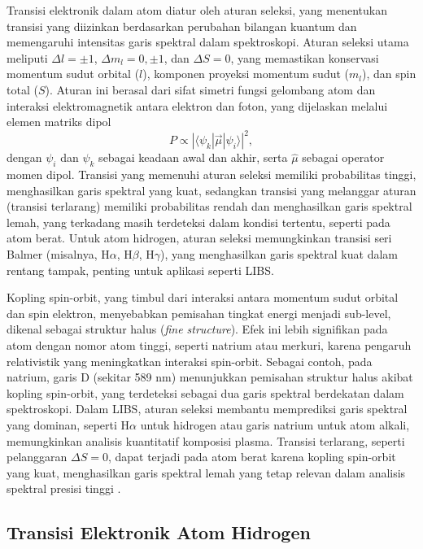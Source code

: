 Transisi elektronik dalam atom diatur oleh aturan seleksi, yang menentukan transisi yang diizinkan berdasarkan perubahan bilangan kuantum dan memengaruhi intensitas garis spektral dalam spektroskopi. Aturan seleksi utama meliputi \( \Delta l = \pm 1 \), \( \Delta m_l = 0, \pm 1 \), dan \( \Delta S = 0 \), yang memastikan konservasi momentum sudut orbital (\( l \)), komponen proyeksi momentum sudut (\( m_l \)), dan spin total (\( S \)). Aturan ini berasal dari sifat simetri fungsi gelombang atom dan interaksi elektromagnetik antara elektron dan foton, yang dijelaskan melalui elemen matriks dipol
\begin{equation}
P \propto |\langle \psi_k | \vec{\mu} | \psi_i \rangle|^2, \label{eq:bab2_eq2}
\end{equation}
dengan \( \psi_i \) dan \( \psi_k \) sebagai keadaan awal dan akhir, serta \( \hat{\mu} \) sebagai operator momen dipol. Transisi yang memenuhi aturan seleksi memiliki probabilitas tinggi, menghasilkan garis spektral yang kuat, sedangkan transisi yang melanggar aturan (transisi terlarang) memiliki probabilitas rendah dan menghasilkan garis spektral lemah, yang terkadang masih terdeteksi dalam kondisi tertentu, seperti pada atom berat. Untuk atom hidrogen, aturan seleksi memungkinkan transisi seri Balmer (misalnya, H\(\alpha\), H\(\beta\), H\(\gamma\)), yang menghasilkan garis spektral kuat dalam rentang tampak, penting untuk aplikasi seperti LIBS. 
\par Kopling spin-orbit, yang timbul dari interaksi antara momentum sudut orbital dan spin elektron, menyebabkan pemisahan tingkat energi menjadi sub-level, dikenal sebagai struktur halus (\textit{fine structure}). Efek ini lebih signifikan pada atom dengan nomor atom tinggi, seperti natrium atau merkuri, karena pengaruh relativistik yang meningkatkan interaksi spin-orbit. Sebagai contoh, pada natrium, garis D (sekitar 589 nm) menunjukkan pemisahan struktur halus akibat kopling spin-orbit, yang terdeteksi sebagai dua garis spektral berdekatan dalam spektroskopi. Dalam LIBS, aturan seleksi membantu memprediksi garis spektral yang dominan, seperti H\(\alpha\) untuk hidrogen atau garis natrium untuk atom alkali, memungkinkan analisis kuantitatif komposisi plasma. Transisi terlarang, seperti pelanggaran \( \Delta S = 0 \), dapat terjadi pada atom berat karena kopling spin-orbit yang kuat, menghasilkan garis spektral lemah yang tetap relevan dalam analisis spektral presisi tinggi \citep{Griffiths2005, CremersRadzemski2013, Demtroder2010}.

\subsection{Transisi Elektronik Atom Hidrogen}

